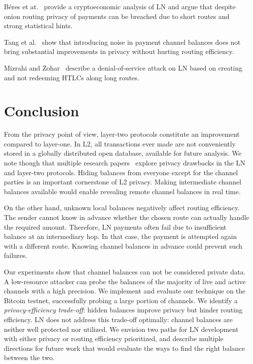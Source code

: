 B{\'{e}}res et at.~\cite{Beres2019} provide a cryptoeconomic analysis of LN and argue that despite onion routing privacy of payments can be breached due to short routes and strong statistical hints.

Tang et al.~\cite{Tang2019} show that introducing noise in payment channel balances does not bring substantial improvements in privacy without hurting routing efficiency.

Mizrahi and Zohar~\cite{Mizrahi2020} describe a denial-of-service attack on LN based on creating and not redeeming HTLCs along long routes.


\section{Conclusion} \label{sec:conclusion}

From the privacy point of view, layer-two protocols constitute an improvement compared to layer-one.
In L2, all transactions ever made are not conveniently stored in a globally distributed open database, available for future analysis.
We note though that multiple research papers~\cite{Tang2020, Rohrer2020, Kappos2020, Tikhomirov2020a, HerreraJoancomarti2019, Beres2019} explore privacy drawbacks in the LN and layer-two protocols.
Hiding balances from everyone except for the channel parties is an important cornerstone of L2 privacy.
Making intermediate channel balances available would enable revealing remote channel balances in real time.

On the other hand, unknown local balances negatively affect routing efficiency.
The sender cannot know in advance whether the chosen route can actually handle the required amount.
Therefore, LN payments often fail due to insufficient balance at an intermediary hop.
In that case, the payment is attempted again with a different route.
Knowing channel balances in advance could prevent such failures.

Our experiments show that channel balances can not be considered private data.
A low-resource attacker can probe the balances of the majority of live and active channels with a high precision.
We implement and evaluate our technique on the Bitcoin testnet, successfully probing a large portion of channels.
We identify a \textit{privacy-efficiency trade-off}: hidden balances improve privacy but hinder routing efficiency.
LN does not address this trade-off optimally: channel balances are neither well protected nor utilized.
We envision two paths for LN development with either privacy or routing efficiency prioritized, and describe multiple directions for future work that would evaluate the ways to find the right balance between the two.